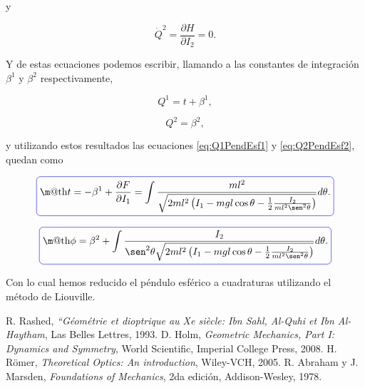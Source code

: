 \documentclass[a4paper,10pt]{article}
\makeatletter
\numberwithin{equation}{section}
\newcommand*{\boxcolor}{blue}
\renewcommand{\boxed}[1]{\textcolor{\boxcolor}{%
\tikz[baseline={([yshift=-1ex]current bounding box.center)}] \node [rectangle, minimum width=1ex,rounded corners,draw] {\normalcolor\m@th$\displaystyle#1$};}}
\makeatother
\begin{document}
y 

\begin{equation}
 \dot{Q}^2 = \frac{\partial H}{\partial I_2} = 0.
\end{equation}

Y de estas ecuaciones podemos escribir, llamando a las constantes de integración 
$\beta^1$ y $\beta^2$ respectivamente, 

\begin{equation}
 Q^1 = t + \beta^1,
\end{equation}

\begin{equation}
 Q^2 = \beta^2,
\end{equation}

y utilizando estos resultados las ecuaciones \eqref{eq:Q1PendEsf1} y \eqref{eq:Q2PendEsf2}, 
quedan como 

\begin{equation}
 \boxed{t = -\beta^1 + \frac{\partial F}{\partial I_1} = \int \frac{ml^2}{\sqrt{2ml^2\left(I_1 -
 mgl\cos{\theta} - \frac{1}{2}\frac{I_2}{ml^2\sen^2{\theta}} \right)}}d\theta.}
\end{equation}

\begin{equation}
 \boxed{\phi = \beta^2 + \int \frac{I_2}{\sen^2{\theta}\sqrt{2ml^2\left(I_1 - mgl\cos{\theta} - 
 \frac{1}{2}\frac{I_2}{ml^2\sen^2{\theta}} \right)}}d\theta.}
\end{equation}

Con lo cual hemos reducido el péndulo esférico a cuadraturas utilizando el método 
de Liouville.

\begin{thebibliography}{10}
R. Rashed, \emph{“Géométrie et dioptrique au Xe siècle: Ibn Sahl, 
Al-Quhi et Ibn Al-Haytham}, Las Belles Lettres, 1993.
D. Holm, \emph{Geometric Mechanics, Part I: Dynamics and Symmetry}, World Scientific, 
Imperial College Press, 2008.
H. Römer, \emph{Theoretical Optics: An introduction}, Wiley-VCH, 2005.
 R. Abraham y J. Marsden, \emph{Foundations of Mechanics}, 2da edición, Addison-Wesley,
 1978.
\end{thebibliography}
\end{document}
